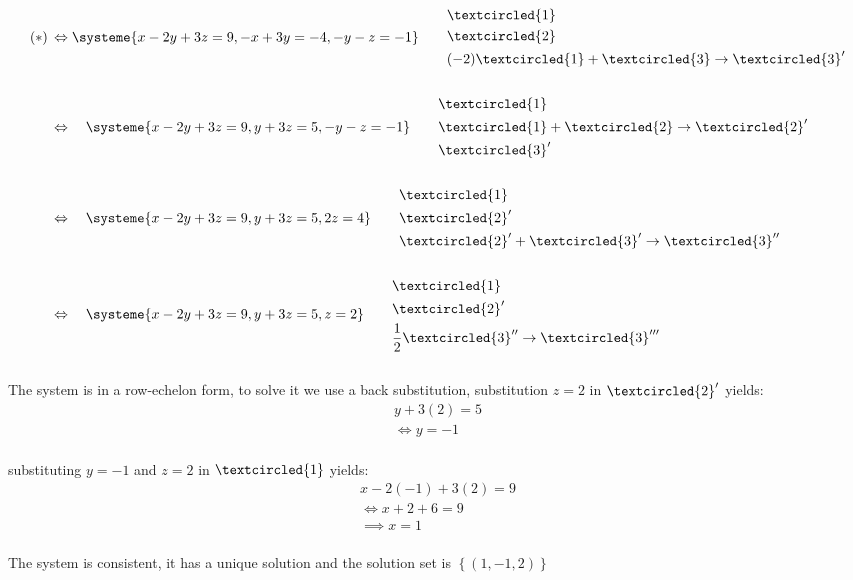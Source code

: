 \documentclass{jhwhw}
\begin{document}
\begin{align*} 
(\ast) \, &\Leftrightarrow \systeme{x-2y+3z=9, -x+3y=-4, -y-z=-1} \quad \quad \begin{aligned} &\textcircled{1} \\ &\textcircled{2} \\ &(-2)\textcircled{1}+\textcircled{3} \rightarrow \textcircled{3}'\end{aligned}
\\ \\
&\Leftrightarrow \quad \systeme{x-2y+3z=9, y+3z=5, -y-z=-1} \quad \quad \begin{aligned} &\textcircled{1} \\ &\textcircled{1}+\textcircled{2} \rightarrow \textcircled{2}' \\ &\textcircled{3}'\end{aligned}
\\ \\
&\Leftrightarrow \quad \systeme{x-2y+3z=9, y+3z=5, 2z=4} \quad \quad \begin{aligned} &\textcircled{1} \\ &\textcircled{2}' \\ &\textcircled{2}'+\textcircled{3}' \rightarrow \textcircled{3}''\end{aligned}
\\ \\
&\Leftrightarrow \quad \systeme{x-2y+3z=9, y+3z=5, z=2} \quad \quad \begin{aligned} &\textcircled{1} \\ &\textcircled{2}' \\ &\frac{1}{2}\textcircled{3}'' \rightarrow \textcircled{3}'''\end{aligned}
\end{align*}
\\

The system is in a row-echelon form, to solve it we use a back substitution, substitution \(\boxed{z=2}\) in \(\textcircled{2}'\) yields:
\\

\begin{align*} 
y+3(2)=5\\
\Leftrightarrow \boxed{y=-1}
\end{align*}
\\

substituting \(y=-1\) and \(z=2\) in \(\textcircled{1}\) yields:
\\

\begin{align*} 
x-2(-1)+3(2)=9\\
\Leftrightarrow x+2+6=9\\
\implies \boxed{x=1}
\end{align*}
\\
The system is consistent, it has a unique solution and the solution set is \(\left\{(1,-1,2)\right\}\)
\\ \\
\end{document}
